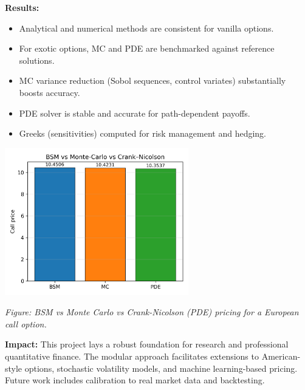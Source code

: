 \documentclass[11pt,a4paper]{article}
\begin{document}
\vspace{1mm}
\noindent
\textbf{Results:}
\begin{itemize}[leftmargin=10pt, itemsep=0pt, parsep=0pt]
    \item Analytical and numerical methods are consistent for vanilla options.
    \item For exotic options, MC and PDE are benchmarked against reference solutions.
    \item MC variance reduction (Sobol sequences, control variates) substantially boosts accuracy.
    \item PDE solver is stable and accurate for path-dependent payoffs.
    \item Greeks (sensitivities) computed for risk management and hedging.
\end{itemize}
\begin{center}
    \includegraphics[width=0.6\textwidth]{../plots/BSM_MC_CN_comparison.png}
    
    \textit{\small Figure: BSM vs Monte Carlo vs Crank-Nicolson (PDE) pricing for a European call option.}
\end{center}
\vspace{1mm}
\noindent
\textbf{Impact:}
This project lays a robust foundation for research and professional quantitative finance. The modular approach facilitates extensions to American-style options, stochastic volatility models, and machine learning-based pricing. Future work includes calibration to real market data and backtesting.
\end{document}
